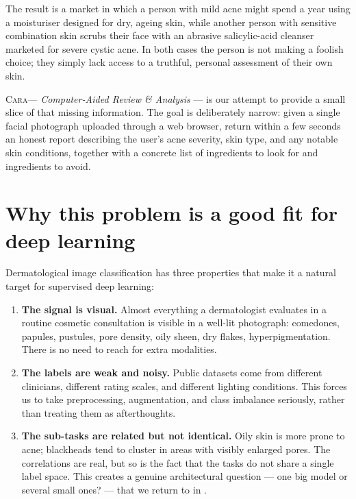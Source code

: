 \documentclass[11pt,a4paper,oneside]{report}
\newcommand{\cara}{\textsc{Cara}\xspace}
\begin{document}
The result is a market in which a person with mild acne might spend a
year using a moisturiser designed for dry, ageing skin, while another
person with sensitive combination skin scrubs their face with an
abrasive salicylic-acid cleanser marketed for severe cystic acne.
In both cases the person is not making a foolish choice; they simply
lack access to a truthful, personal assessment of their own skin.

\cara --- \emph{Computer-Aided Review \& Analysis} --- is our attempt to
provide a small slice of that missing information. The goal is
deliberately narrow: given a single facial photograph uploaded through
a web browser, return within a few seconds an honest report describing
the user's acne severity, skin type, and any notable skin conditions,
together with a concrete list of ingredients to look for and
ingredients to avoid.

\section{Why this problem is a good fit for deep learning}

Dermatological image classification has three properties that make
it a natural target for supervised deep learning:

\begin{enumerate}
    \item \textbf{The signal is visual.} Almost everything a
        dermatologist evaluates in a routine cosmetic consultation
        is visible in a well-lit photograph: comedones, papules,
        pustules, pore density, oily sheen, dry flakes,
        hyperpigmentation. There is no need to reach for extra
        modalities.
    \item \textbf{The labels are weak and noisy.} Public datasets
        come from different clinicians, different rating scales,
        and different lighting conditions. This forces us to take
        preprocessing, augmentation, and class imbalance
        seriously, rather than treating them as afterthoughts.
    \item \textbf{The sub-tasks are related but not identical.}
        Oily skin is more prone to acne; blackheads tend to
        cluster in areas with visibly enlarged pores. The
        correlations are real, but so is the fact that the tasks
        do not share a single label space. This creates a genuine
        architectural question --- one big model or several small
        ones? --- that we return to in .
\end{enumerate}
\end{document}
